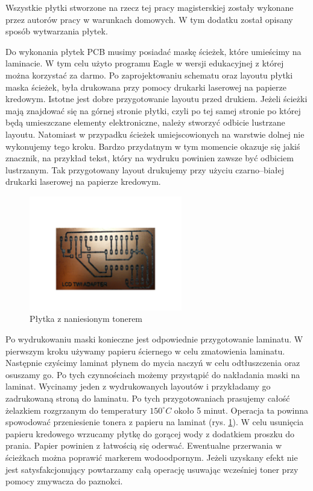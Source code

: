 \label{chap:pcb}
Wszystkie płytki stworzone na rzecz tej pracy magisterskiej zostały wykonane przez autorów pracy w warunkach domowych. W tym dodatku został opisany sposób wytwarzania płytek.

Do wykonania płytek PCB musimy posiadać maskę ścieżek, które umieścimy na laminacie. W tym celu użyto programu Eagle w wersji edukacyjnej z której można korzystać za darmo. Po zaprojektowaniu schematu oraz layoutu płytki maska ścieżek, była drukowana przy pomocy drukarki laserowej na papierze kredowym. Istotne jest dobre przygotowanie layoutu przed drukiem. Jeżeli ścieżki mają znajdować się na górnej stronie płytki, czyli po tej samej stronie po której będą umieszczane elementy elektroniczne, należy stworzyć odbicie lustrzane layoutu. Natomiast w przypadku ścieżek umiejscowionych na warstwie dolnej nie wykonujemy tego kroku. Bardzo przydatnym w tym momencie okazuje się jakiś znacznik, na przykład tekst, który na wydruku powinien zawsze być odbiciem lustrzanym. Tak przygotowany layout drukujemy przy użyciu czarno--białej drukarki laserowej na papierze kredowym.

\begin{figure}[!ht]
 \centering
 \includegraphics[height=50mm]{../images/appendix/toner.JPG}
 \caption{Płytka z naniesionym tonerem}
 \label{fig:PlytkaZTonerem}
\end{figure}

Po wydrukowaniu maski konieczne jest odpowiednie przygotowanie laminatu. W pierwszym kroku używamy papieru ściernego w celu zmatowienia laminatu. Następnie czyścimy laminat płynem do mycia naczyń w celu odtłuszczenia oraz osuszamy go. Po tych czynnościach możemy przystąpić do nakładania maski na laminat. Wycinamy jeden z wydrukowanych layoutów i przykładamy go zadrukowaną stroną do laminatu. Po tych przygotowaniach prasujemy całość żelazkiem rozgrzanym do temperatury $150^{\circ}C$ około 5 minut. Operacja ta powinna spowodować przeniesienie tonera z papieru na laminat (rys. \ref{fig:PlytkaZTonerem}). W celu usunięcia papieru kredowego wrzucamy płytkę do gorącej wody z dodatkiem proszku do prania. Papier powinien z łatwością się oderwać. Ewentualne przerwania w ścieżkach można poprawić markerem wodoodpornym. Jeżeli uzyskany efekt nie jest satysfakcjonujący powtarzamy całą operację usuwając wcześniej toner przy pomocy zmywacza do paznokci.

